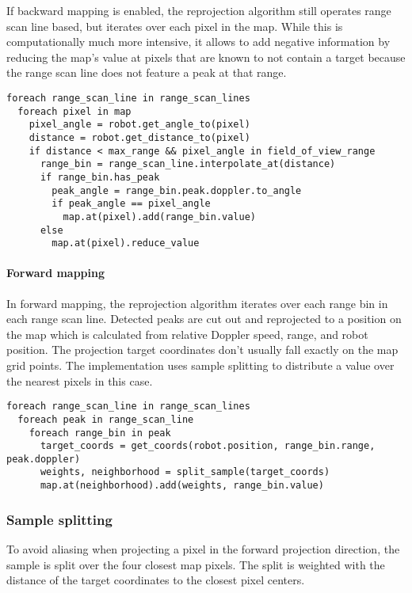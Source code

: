If backward mapping is enabled, the reprojection algorithm still
operates range scan line based, but iterates over each pixel in the map.
While this is computationally much more intensive, it allows to add
negative information by reducing the map's value at pixels that are
known to not contain a target because the range scan line does not
feature a peak at that range.

\begin{verbatim}
foreach range_scan_line in range_scan_lines
  foreach pixel in map
    pixel_angle = robot.get_angle_to(pixel)
    distance = robot.get_distance_to(pixel)
    if distance < max_range && pixel_angle in field_of_view_range
      range_bin = range_scan_line.interpolate_at(distance)
      if range_bin.has_peak
        peak_angle = range_bin.peak.doppler.to_angle
        if peak_angle == pixel_angle
          map.at(pixel).add(range_bin.value)
      else
        map.at(pixel).reduce_value
\end{verbatim}

\paragraph{Forward mapping}\label{forward-mapping}

In forward mapping, the reprojection algorithm iterates over each range
bin in each range scan line. Detected peaks are cut out and reprojected
to a position on the map which is calculated from relative Doppler
speed, range, and robot position. The projection target coordinates
don't usually fall exactly on the map grid points. The implementation
uses sample splitting to distribute a value over the nearest pixels in
this case.

\begin{verbatim}
foreach range_scan_line in range_scan_lines
  foreach peak in range_scan_line
    foreach range_bin in peak
      target_coords = get_coords(robot.position, range_bin.range, peak.doppler)
      weights, neighborhood = split_sample(target_coords)
      map.at(neighborhood).add(weights, range_bin.value)
\end{verbatim}

\subsubsection{Sample splitting}\label{sample-splitting}

To avoid aliasing when projecting a pixel in the forward projection
direction, the sample is split over the four closest map pixels. The
split is weighted with the distance of the target coordinates to the
closest pixel centers.

